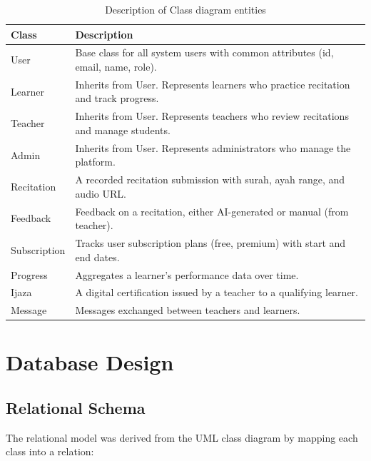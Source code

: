 \begin{table}[H]
  \centering
  \caption{Description of Class diagram entities}
  \label{tab:cs_class_desc}
  \renewcommand{\arraystretch}{1.3}
  \begin{tabular}{lp{10cm}}
    \toprule
    \textbf{Class} & \textbf{Description} \\
    \midrule
    User & Base class for all system users with common attributes (id, email, name, role). \\
    Learner & Inherits from User. Represents learners who practice recitation and track progress. \\
    Teacher & Inherits from User. Represents teachers who review recitations and manage students. \\
    Admin & Inherits from User. Represents administrators who manage the platform. \\
    Recitation & A recorded recitation submission with surah, ayah range, and audio URL. \\
    Feedback & Feedback on a recitation, either AI-generated or manual (from teacher). \\
    Subscription & Tracks user subscription plans (free, premium) with start and end dates. \\
    Progress & Aggregates a learner's performance data over time. \\
    Ijaza & A digital certification issued by a teacher to a qualifying learner. \\
    Message & Messages exchanged between teachers and learners. \\
    \bottomrule
  \end{tabular}
\end{table}

\section{Database Design}
\label{sec:cs_database}

\subsection{Relational Schema}
The relational model was derived from the UML class diagram by mapping each class into a relation:

